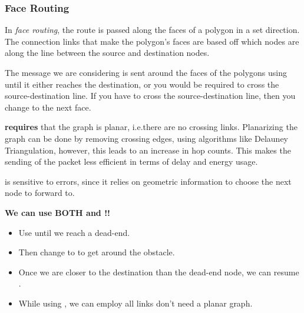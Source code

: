 \subsubsection{Face Routing}\label{subsubsec:Face_Routing}
\begin{definition}\label{def:Face_Routing}
  In \emph{face routing}, the route is passed along the faces of a polygon in a set direction.
  The connection links that make the polygon's faces are based off which nodes are along the line between the source and destination nodes.

  The message we are considering is sent around the faces of the polygons using  until it either reaches the destination, or you would be required to cross the source-destination line.
  If you have to cross the source-destination line, then you change to the next face.

  \begin{remark}\label{rmk:Face_Routing-Planar_Graphs}
     \textbf{requires} that the graph is planar, i.e.\@ there are no crossing links.
    Planarizing the graph can be done by removing crossing edges, using algorithms like Delauney Triangulation, however, this leads to an increase in hop counts.
    This makes the sending of the packet less efficient in terms of delay and energy usage.
  \end{remark}

  \begin{remark}\label{rmk:Face_Routing-Localization_Errors}
     is sensitive to  errors, since it relies on geometric information to choose the next node to forward to.
  \end{remark}
\end{definition}

\large{\textbf{We can use BOTH  and !!}}
\begin{itemize}[noitemsep]
\item Use  until we reach a dead-end.
\item Then change to  to get around the obstacle.
\item Once we are closer to the destination than the dead-end node, we can resume .
\item While using , we can employ all links don’t need a planar graph.
\end{itemize}

